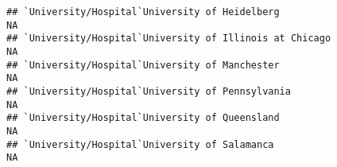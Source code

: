 \documentclass[]{article}
\begin{document}
\begin{verbatim}
## `University/Hospital`University of Heidelberg                                                                                                                                                                                                                                                                                                                                                                                                                                           NA
## `University/Hospital`University of Illinois at Chicago                                                                                                                                                                                                                                                                                                                                                                                                                                  NA
## `University/Hospital`University of Manchester                                                                                                                                                                                                                                                                                                                                                                                                                                           NA
## `University/Hospital`University of Pennsylvania                                                                                                                                                                                                                                                                                                                                                                                                                                         NA
## `University/Hospital`University of Queensland                                                                                                                                                                                                                                                                                                                                                                                                                                           NA
## `University/Hospital`University of Salamanca                                                                                                                                                                                                                                                                                                                                                                                                                                            NA

\end{verbatim}
\end{document}

